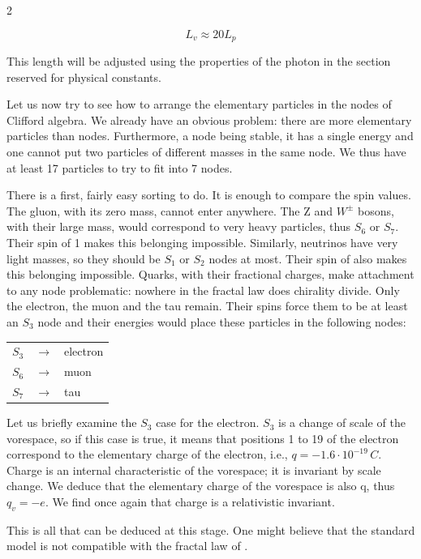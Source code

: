 \begin{multicols}{2}
	
	\begin{equation*}
		L_v \approx 20 L_p
	\end{equation*}
	
	This length will be adjusted using the properties of the photon in the 
	section reserved for physical constants.
	\medskip
	
	Let us now try to see how to arrange the elementary particles in the nodes 
	of Clifford algebra. We already have an obvious problem: there are more 
	elementary particles than nodes. Furthermore, a node being stable, it 
	has a single energy and one cannot put two particles of different masses 
	in the same node. We thus have at least 17 particles to try to fit into 7 
	nodes.
	
	There is a first, fairly easy sorting to do. It is enough to compare the 
	spin values. The gluon, with its zero mass, cannot enter anywhere. The Z 
	and $W^\pm$ bosons, with their large mass, would correspond to very heavy 
	particles, thus $S_6$ or $S_7$. Their spin of 1 makes this belonging 
	impossible. Similarly, neutrinos have very light masses, so they should be 
	$S_1$ or $S_2$ nodes at most. Their spin of  also makes this 
	belonging impossible. Quarks, with their fractional charges, make 
	attachment to any node problematic: nowhere in the fractal law does 
	chirality divide. Only the electron, the muon and the tau remain. Their 
	spins force them to be at least an $S_3$ node and their energies would 
	place these particles in the following nodes:
	
	\begin{center}
		\begin{tabular}{ c c l }
			$S_3$ & $\rightarrow$ & electron \\
			$S_6$ & $\rightarrow$ & muon     \\
			$S_7$ & $\rightarrow$ & tau 
		\end{tabular}
	\end{center}
	
	Let us briefly examine the $S_3$ case for the electron. $S_3$ is a change 
	of scale of the vorespace, so if this case is true, it means that 
	positions 1 to 19 of the electron correspond to the elementary charge of 
	the electron, i.e., $q=-1.6\cdot10^{-19}\,C$. Charge is an internal 
	characteristic of the vorespace; it is invariant by scale change. We 
	deduce that the elementary charge of the vorespace is also q, thus 
	$q_v=-e$. We find once again that charge is a relativistic invariant.
	
	This is all that can be deduced at this stage. One might believe that the 
	standard model is not compatible with the fractal law of \PQ.
	

\end{multicols}
